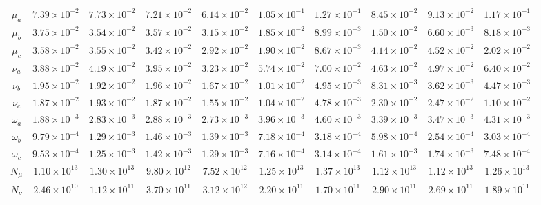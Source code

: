 \documentclass[aps,twocolumn,superscriptaddress,showpacs,nofootinbib]{revtex4-2}
\begin{document}
\begin{table}[bpth!]
{\begin{tabular}{c|cccc|ccccc}
	\hline
	$\mu_a$ & $7.39\times10^{-2}$ & $7.73\times10^{-2}$ & $7.21\times10^{-2}$ & $6.14\times10^{-2}$ & $1.05\times10^{-1}$ & $1.27\times10^{-1}$ & $8.45\times10^{-2}$ & $9.13\times10^{-2}$ & $1.17\times10^{-1}$\\
	$\mu_b$ & $3.75\times10^{-2}$ & $3.54\times10^{-2}$ & $3.57\times10^{-2}$ & $3.15\times10^{-2}$ & $1.85\times10^{-2}$ & $8.99\times10^{-3}$ & $1.50\times10^{-2}$ & $6.60\times10^{-3}$ & $8.18\times10^{-3}$\\
     $\mu_c$ & $3.58\times10^{-2}$ & $3.55\times10^{-2}$ & $3.42\times10^{-2}$ & $2.92\times10^{-2}$ & $1.90\times10^{-2}$ & $8.67\times10^{-3}$ & $4.14\times10^{-2}$ & $4.52\times10^{-2}$ & $2.02\times10^{-2}$\\
     $\nu_a$ & $3.88\times10^{-2}$ & $4.19\times10^{-2}$ & $3.95\times10^{-2}$ & $3.23\times10^{-2}$ & $5.74\times10^{-2}$ & $7.00\times10^{-2}$ & $4.63\times10^{-2}$ & $4.97\times10^{-2}$ & $6.40\times10^{-2}$\\
     $\nu_b$ & $1.95\times10^{-2}$ & $1.92\times10^{-2}$ & $1.96\times10^{-2}$ & $1.67\times10^{-2}$ & $1.01\times10^{-2}$ & $4.95\times10^{-3}$ & $8.31\times10^{-3}$ & $3.62\times10^{-3}$ & $4.47\times10^{-3}$\\
     $\nu_c$ & $1.87\times10^{-2}$ & $1.93\times10^{-2}$ & $1.87\times10^{-2}$ & $1.55\times10^{-2}$ & $1.04\times10^{-2}$ & $4.78\times10^{-3}$ & $2.30\times10^{-2}$ & $2.47\times10^{-2}$ & $1.10\times10^{-2}$\\
  $\omega_a$ & $1.88\times10^{-3}$ & $2.83\times10^{-3}$ & $2.88\times10^{-3}$ & $2.73\times10^{-3}$ & $3.96\times10^{-3}$ & $4.60\times10^{-3}$ & $3.39\times10^{-3}$ & $3.47\times10^{-3}$ & $4.31\times10^{-3}$\\
  $\omega_b$ & $9.79\times10^{-4}$ & $1.29\times10^{-3}$ & $1.46\times10^{-3}$ & $1.39\times10^{-3}$ & $7.18\times10^{-4}$ & $3.18\times10^{-4}$ & $5.98\times10^{-4}$ & $2.54\times10^{-4}$ & $3.03\times10^{-4}$\\
  $\omega_c$ & $9.53\times10^{-4}$ & $1.25\times10^{-3}$ & $1.42\times10^{-3}$ & $1.29\times10^{-3}$ & $7.16\times10^{-4}$ & $3.14\times10^{-4}$ & $1.61\times10^{-3}$ & $1.74\times10^{-3}$ & $7.48\times10^{-4}$\\
$N_{\mu}$	& $1.10\times10^{13}$ & $1.30\times10^{13}$ & $9.80\times10^{12}$ & $7.52\times10^{12}$ & $1.25\times10^{13}$ & $1.37\times10^{13}$ & $1.12\times10^{13}$ & $1.12\times10^{13}$ & $1.26\times10^{13}$\\
$N_{\nu}$	& $2.46\times10^{10}$ & $1.12\times10^{11}$ & $3.70\times10^{11}$ & $3.12\times10^{12}$ & $2.20\times10^{11}$ & $1.70\times10^{11}$ & $2.90\times10^{11}$ & $2.69\times10^{11}$ & $1.89\times10^{11}$\\

\end{tabular}}
\end{table}
\end{document}
